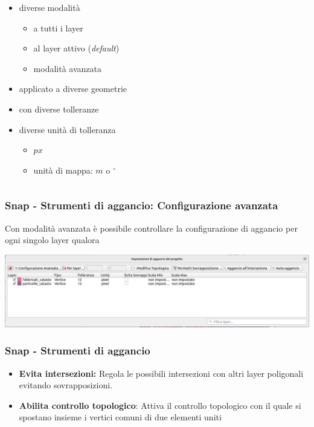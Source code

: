 \documentclass{beamer}
\begin{document}
{\begin{frame}
\begin{columns}
\begin{column}{.6\textwidth}
\begin{itemize}
                \item diverse modalità
                \begin{itemize}
                    \item a tutti i layer
                    \item al layer attivo (\emph{default})
                    \item modalità avanzata
                \end{itemize}
                \item applicato a diverse geometrie
                \item con diverse tolleranze
                \item diverse unità di tolleranza
                    \begin{itemize}
                        \item $px$
                        \item unità di mappa: $m$ o $^{\circ}$
                    \end{itemize}
            \end{itemize}
        \end{column}
    \end{columns}

\end{frame}


\begin{frame}
    \frametitle{Snap - Strumenti di aggancio: Configurazione avanzata}
    Con modalità avanzata è possibile controllare la configurazione di aggancio per ogni singolo layer qualora
    \begin{center}
    	\includegraphics[width=\textwidth] {digitizing_pics/Configurazione avanzata snap del 2022-10-12 09-37-04.png}
    \end{center}
\end{frame}


\begin{frame}
    \frametitle{Snap - Strumenti di aggancio}
    \begin{itemize}
        \item \textbf{Evita intersezioni:} Regola le possibili intersezioni con altri layer poligonali evitando sovrapposizioni.
        \item \textbf{Abilita controllo topologico}: Attiva il controllo topologico con il quale si spostano insieme i vertici comuni di due elementi uniti
    \end{itemize}
\bigskip


\end{frame}}
\end{document}
